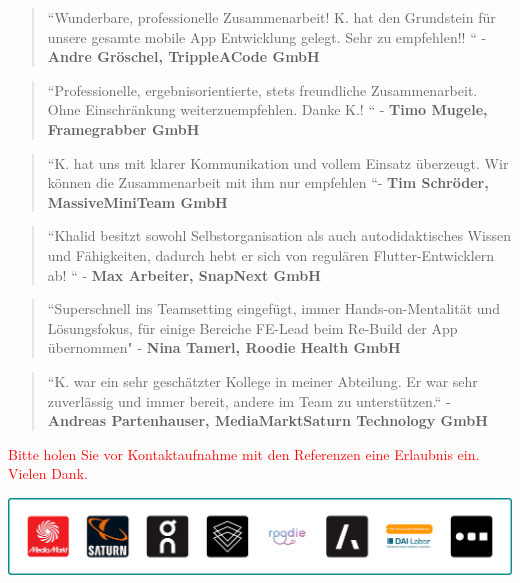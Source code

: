 \documentclass[10pt,a4paper,normalphoto]{altacv}
\begin{document}
\begin{fullwidth}
\begin{quote}
``Wunderbare, professionelle Zusammenarbeit! K. hat den Grundstein für unsere gesamte mobile App Entwicklung gelegt. Sehr zu empfehlen!! `` - \textbf{Andre Gröschel, TrippleACode GmbH}\\
\end{quote}
\vspace{.5em}
\begin{quote}
``Professionelle, ergebnisorientierte, stets freundliche Zusammenarbeit. Ohne Einschränkung weiterzuempfehlen. Danke K.! `` - \textbf{Timo Mugele, Framegrabber GmbH}\\
\end{quote}

\vspace{.5em}

\begin{quote}
``K. hat uns mit klarer Kommunikation und vollem Einsatz überzeugt. Wir können die Zusammenarbeit mit ihm nur empfehlen ``- \textbf{Tim Schröder, MassiveMiniTeam GmbH}\\
\end{quote}

\vspace{.5em}
\begin{quote}
``Khalid besitzt sowohl Selbstorganisation als auch autodidaktisches Wissen und Fähigkeiten, dadurch hebt er sich von regulären Flutter-Entwicklern ab! `` - \textbf{Max Arbeiter, SnapNext GmbH}\\
\end{quote}

\vspace{.5em}    
\begin{quote}
``Superschnell ins Teamsetting eingefügt, immer Hands-on-Mentalität und Lösungsfokus, für einige Bereiche FE-Lead beim Re-Build der App übernommen" - \textbf{Nina Tamerl, Roodie Health GmbH}\\
\end{quote}

\vspace{.5em}
\begin{quote}
``K. war ein sehr geschätzter Kollege in meiner Abteilung. Er war sehr zuverlässig und immer bereit, andere im Team zu unterstützen.`` - \textbf{Andreas Partenhauser, MediaMarktSaturn Technology GmbH}\\
\end{quote}

\vspace{.5em}
\textcolor{red}{\small Bitte holen Sie vor Kontaktaufnahme mit den Referenzen eine Erlaubnis ein. Vielen Dank.}
\end{fullwidth}

\begin{center}
  \includegraphics[width=0.905\paperwidth]{company-logos-outline.png}
\end{center}
\end{document}
